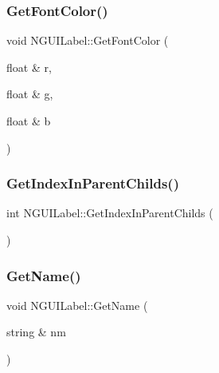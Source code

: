 \hypertarget{class_n_g_u_i_label_a1357fd4ef0e42a446c8250da7845df35}{}\label{class_n_g_u_i_label_a1357fd4ef0e42a446c8250da7845df35} 
\subsubsection{\texorpdfstring{Get\+Font\+Color()}{GetFontColor()}}
{\footnotesize\ttfamily void N\+G\+U\+I\+Label\+::\+Get\+Font\+Color (\begin{DoxyParamCaption}\item[{float \&}]{r,  }\item[{float \&}]{g,  }\item[{float \&}]{b }\end{DoxyParamCaption})}

\hypertarget{class_n_g_u_i_label_af6fd4fc621c2db410b3328adbe96e29d}{}\label{class_n_g_u_i_label_af6fd4fc621c2db410b3328adbe96e29d} 
\subsubsection{\texorpdfstring{Get\+Index\+In\+Parent\+Childs()}{GetIndexInParentChilds()}}
{\footnotesize\ttfamily int N\+G\+U\+I\+Label\+::\+Get\+Index\+In\+Parent\+Childs (\begin{DoxyParamCaption}{ }\end{DoxyParamCaption})}

\hypertarget{class_n_g_u_i_label_a151738ce22b2abd0388d2101964ad405}{}\label{class_n_g_u_i_label_a151738ce22b2abd0388d2101964ad405} 
\subsubsection{\texorpdfstring{Get\+Name()}{GetName()}}
{\footnotesize\ttfamily void N\+G\+U\+I\+Label\+::\+Get\+Name (\begin{DoxyParamCaption}\item[{string \&}]{nm }\end{DoxyParamCaption})}

\hypertarget{class_n_g_u_i_label_a895ce6c61a2ea8957cbbf8878acad7ff}{}\label{class_n_g_u_i_label_a895ce6c61a2ea8957cbbf8878acad7ff} 
